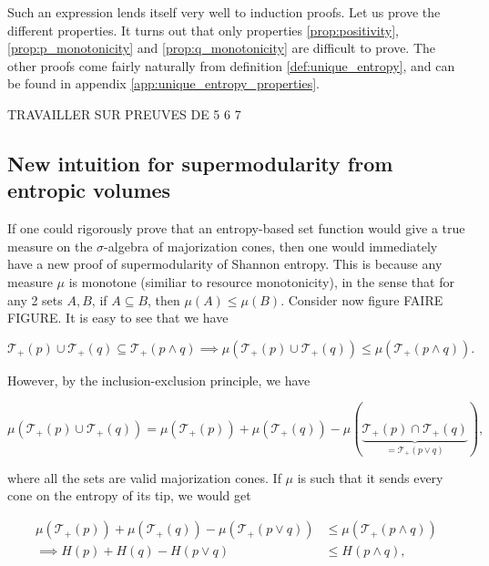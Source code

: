 Such an expression lends itself very well to induction proofs. Let us prove the different properties. It turns out that only properties \ref{prop:positivity}, \ref{prop:p_monotonicity} and \ref{prop:q_monotonicity} are difficult to prove. The other proofs come fairly naturally from definition \ref{def:unique_entropy}, and can be found in appendix \ref{app:unique_entropy_properties}. 

TRAVAILLER SUR PREUVES DE 5 6 7



\subsection{New intuition for supermodularity from entropic volumes}

If one could rigorously prove that an entropy-based set function would give a true measure on the $\sigma$-algebra of majorization cones, then one would immediately have a new proof of supermodularity of Shannon entropy. This is because any measure $\mu$ is monotone (similiar to resource monotonicity), in the sense that for any 2 sets $A, B$, if $A \subseteq B$, then $\mu(A) \leq \mu(B)$. Consider now figure FAIRE FIGURE. It is easy to see that we have

\begin{equation}
    \mathcal{T}_+(p) \cup \mathcal{T}_+(q) \subseteq \mathcal{T}_+(p \wedge q) \implies \mu\left(\mathcal{T}_+(p) \cup \mathcal{T}_+(q)\right) \leq \mu\left(\mathcal{T}_+(p \wedge q)\right).
\end{equation}

\noindent However, by the inclusion-exclusion principle, we have 

\begin{equation}
    \mu\left(\mathcal{T}_+(p) \cup \mathcal{T}_+(q)\right) = \mu\left(\mathcal{T}_+(p)\right) + \mu\left(\mathcal{T}_+(q)\right) - \mu\left(\underbrace{\mathcal{T}_+(p) \cap \mathcal{T}_+(q)}_{= \mathcal{T}_+(p \vee q)}\right),
\end{equation}

\noindent where all the sets are valid majorization cones. If $\mu$ is such that it sends every cone on the entropy of its tip, we would get

\begin{align}
    \mu\left(\mathcal{T}_+(p)\right) + \mu\left(\mathcal{T}_+(q)\right) - \mu\left(\mathcal{T}_+(p \vee q)\right) &\leq \mu\left(\mathcal{T}_+(p \wedge q)\right)\\
    \implies H(p) + H(q) - H(p \vee q) &\leq H(p \wedge q),
\end{align}

